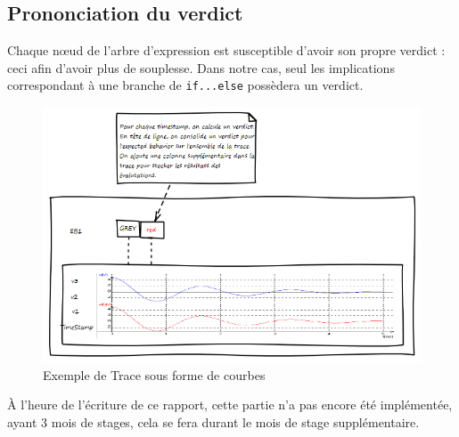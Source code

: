 	\subsection{Prononciation du verdict}
	Chaque n\oe{}ud de l'arbre d'expression est susceptible d'avoir son propre verdict : ceci afin d'avoir plus de souplesse. Dans notre cas, seul les implications correspondant à une branche de \texttt{if...else} possèdera un verdict.
\vfill~\vfill

	\begin{figure}[H]
		\centering
		\includegraphics[width=16cm]{contents/images/trace.png}
		\caption{Exemple de Trace sous forme de courbes}
	\end{figure}

	\begin{remarque}
	À l'heure de l'écriture de ce rapport, cette partie n'a pas encore été implémentée, ayant 3 mois de stages, cela se fera durant le mois de stage supplémentaire.
	\end{remarque}